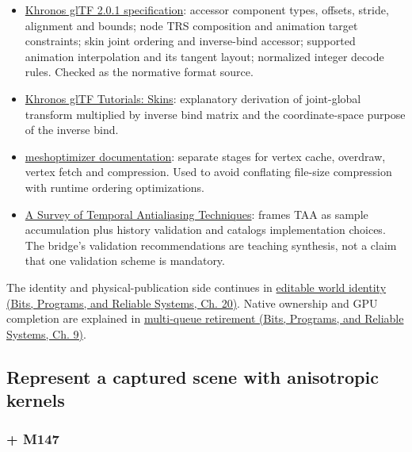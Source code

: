 \begin{itemize}
\tightlist
\item
  \href{https://registry.khronos.org/glTF/specs/2.0/glTF-2.0.html}{Khronos glTF 2.0.1 specification}: accessor component types, offsets, stride, alignment and bounds; node TRS composition and animation target constraints; skin joint ordering and inverse-bind accessor; supported animation interpolation and its tangent layout; normalized integer decode rules. Checked as the normative format source.
\item
  \href{https://github.com/KhronosGroup/glTF-Tutorials/blob/main/gltfTutorial/gltfTutorial_020_Skins.md}{Khronos glTF Tutorials: Skins}: explanatory derivation of joint-global transform multiplied by inverse bind matrix and the coordinate-space purpose of the inverse bind.
\item
  \href{https://meshoptimizer.org/}{meshoptimizer documentation}: separate stages for vertex cache, overdraw, vertex fetch and compression. Used to avoid conflating file-size compression with runtime ordering optimizations.
\item
  \href{https://diglib.eg.org/items/cfa6a05c-53b3-4ee1-979d-48abc6225f6b}{A Survey of Temporal Antialiasing Techniques}: frames TAA as sample accumulation plus history validation and catalogs implementation choices. The bridge's validation recommendations are teaching synthesis, not a claim that one validation scheme is mandatory.
\end{itemize}

The identity and physical-publication side continues in \href{../01-Bits-Programs-and-Reliable-Systems/main.pdf\#nameddest=06-engine-ii-ch042-rendering-identity-becomes-world-identity-only-through-an-explicit-bridge}{editable world identity (Bits, Programs, and Reliable Systems, Ch. 20)}. Native ownership and GPU completion are explained in \href{../01-Bits-Programs-and-Reliable-Systems/main.pdf\#nameddest=01-foundations-i-ch011-retire-a-resource-after-every-user-not-after-one-convenient-clock}{multi-queue retirement (Bits, Programs, and Reliable Systems, Ch. 9)}.

\subsection{Represent a captured scene with anisotropic kernels}\label{04-visual-computing-ii-ch037-represent-a-captured-scene-with-anisotropic-kernels}

\subsubsection{+ M147}\label{04-visual-computing-ii-ch037-m147}

